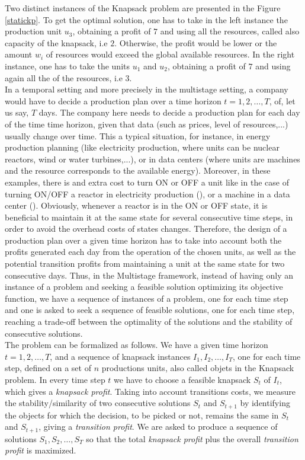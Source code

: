 \documentclass[a4paper]{book}
\begin{document}
Two distinct instances of the {\sc Knapsack} problem are presented in the Figure \ref{statickp}. To get the optimal solution, one has to take in the left instance the production unit $u_3$, obtaining a profit of $7$ and using all the resources, called also capacity of the knapsack, i.e $2$. Otherwise, the profit would be lower or the amount $w_i$ of resources would exceed the global available resources. In the right instance, one has to take the units $u_1$ and $u_2$, obtaining a profit of $7$ and using again all the of the resources, i.e $3$.\\

In a temporal setting and more precisely in the multistage setting, a company would have to decide a production plan over a time horizon $t=1,2,\ldots, T$, of, let us say, $T$ days. The company here needs to decide a production plan for each day of the time time horizon, given that data (such as prices, level of resources,...) usually change over time. This a typical situation, for instance, in energy production planning (like electricity production, where units can be nuclear reactors, wind or water turbines,...), or in data centers (where units are machines and the resource corresponds to the available energy). Moreover, in these examples, there is and extra cost to turn ON or OFF a unit like in the case of turning ON/OFF a reactor in electricity production (\cite{rottner2018combinatorial}), or a machine in a data center (\cite{DBLP:conf/spaa/2017}). Obviously, whenever a reactor is in the ON or OFF state, it is beneficial to maintain it at the same state for several consecutive time steps, in order to avoid the overhead costs of states changes. Therefore, the design of a production plan over a given time horizon has to take into account both the profits generated each day from the operation of the chosen units, as well as the potential transition profits from maintaining a unit at the same state for two consecutive days. Thus, in the {\sc Multistage} framework, instead of having only an instance of a problem and seeking a feasible solution optimizing its objective function, we have a sequence of instances of a problem, one for each time step and one is asked to seek a sequence of feasible solutions, one for each time step, reaching a trade-off between the optimality of the solutions and the stability of consecutive solutions.\\
The problem can be formalized as follows. We have a given time horizon $t=1,2,\ldots,T$, and a sequence of knapsack instances $I_1, I_2, \ldots,I_T$, one for each time step, defined on a set of $n$ productions units, also called objets in the {\sc Knapsack} problem. In every time step $t$ we have to choose a feasible knapsack $S_t$ of $I_t$, which gives a \textit{knapsack profit}. Taking into account transitions costs, we measure the stability/similarity of two consecutive solutions $S_t$ and $S_{t+1}$ by identifying the objects for which the decision, to be picked or not, remains the same in $S_t$ and $S_{t+1}$, giving a \textit{transition profit}. We are asked to produce a sequence of solutions $S_1, S_2, \ldots, S_T$ so that the total \textit{knapsack profit} plus the overall \textit{transition profit} is maximized.\\
\end{document}
